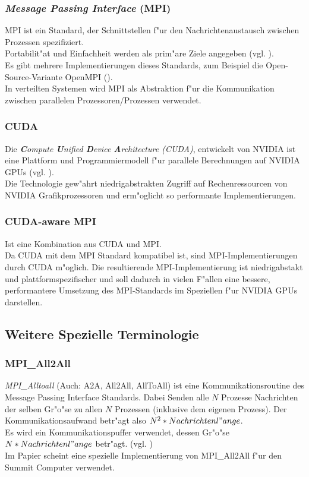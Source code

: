 \subsubsection{ \textit{Message Passing Interface} (MPI) }
MPI ist ein Standard, der Schnittstellen f"ur den Nachrichtenaustausch zwischen Prozessen spezifiziert.\\
Portabilit"at und Einfachheit werden als prim"are Ziele angegeben (vgl. \cite[Kap. 1.1]{mpi}).\\
Es gibt mehrere Implementierungen dieses Standards, zum Beispiel die Open-Source-Variante OpenMPI (\cite{openmpi}).\\
In verteilten Systemen wird MPI als Abstraktion f"ur die Kommunikation zwischen parallelen Prozessoren/Prozessen verwendet.

\subsubsection{ CUDA }
Die \textit{\textbf{C}ompute \textbf{U}nified \textbf{D}evice \textbf{A}rchitecture (CUDA)}, entwickelt von NVIDIA ist eine Plattform und Programmiermodell f"ur parallele Berechnungen auf NVIDIA GPUs (vgl. \cite{cuda}).\\
Die Technologie gew"ahrt niedrigabstrakten Zugriff auf Rechenressourcen von NVIDIA Grafikprozessoren und erm"oglicht so performante Implementierungen.

\subsubsection{ CUDA-aware MPI }
Ist eine Kombination aus CUDA und MPI.\\
Da CUDA mit dem MPI Standard kompatibel ist, sind MPI-Implementierungen durch CUDA m"oglich. Die resultierende MPI-Implementierung ist niedrigabstakt und plattformspezifischer und soll dadurch in vielen F"allen eine bessere, performantere Umsetzung des MPI-Standards im Speziellen f"ur NVIDIA GPUs darstellen.

\subsection{Weitere Spezielle Terminologie}

\subsubsection{MPI\_All2All}
\textit{MPI\_Alltoall} (Auch: A2A, All2All, AllToAll) ist eine Kommunikationsroutine des Message Passing Interface Standards. Dabei Senden alle $N$ Prozesse Nachrichten der selben Gr"o"se zu allen $N$ Prozessen (inklusive dem eigenen Prozess). Der Kommunikationsaufwand betr"agt also $N^2 * Nachrichtenl"ange$.\\
Es wird ein Kommunikationspuffer verwendet, dessen Gr"o"se $N*Nachrichtenl"ange$ betr"agt. (vgl. \cite{MPImanpage})\\
Im Papier \cite{mainpaper} scheint eine spezielle Implementierung von MPI\_All2All f"ur den Summit Computer verwendet.

